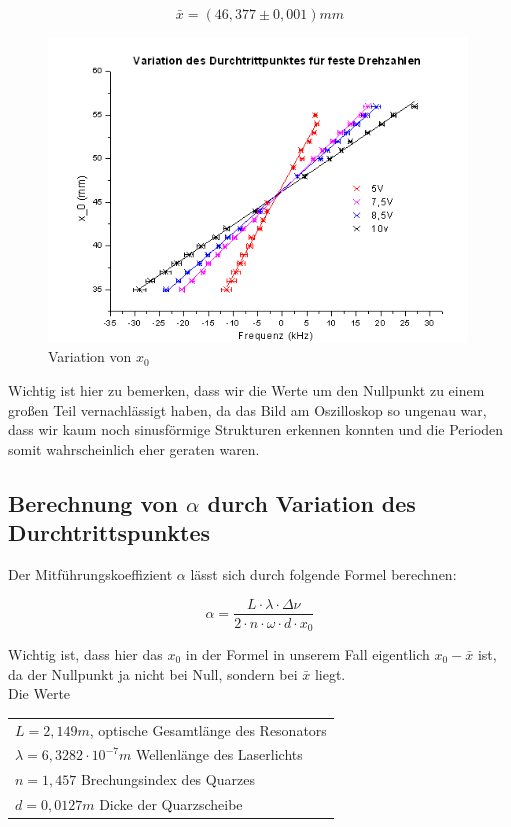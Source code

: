 $$\boxed{\bar x = (46,377 \pm 0,001) mm}$$

\begin{figure}[H]
	\centering \includegraphics[width = 0.99\textwidth]{Bilder/graph1.jpg}
	\caption{Variation von $x_0$}
\end{figure}

Wichtig ist hier zu bemerken, dass wir die Werte um den Nullpunkt zu einem großen Teil vernachlässigt haben, da das Bild am Oszilloskop so ungenau war, dass wir kaum noch sinusförmige Strukturen erkennen konnten und die Perioden somit wahrscheinlich eher geraten waren.

\subsection{Berechnung von $\alpha$ durch Variation des Durchtrittspunktes}

Der Mitführungskoeffizient $\alpha$ lässt sich durch folgende Formel berechnen:

$$\alpha = \frac{L\cdot\lambda\cdot\Delta\nu}{2\cdot n\cdot\omega\cdot d \cdot x_0}$$

Wichtig ist, dass hier das $x_0$ in der Formel in unserem Fall eigentlich $x_0 - \bar x$ ist, da der Nullpunkt ja nicht bei Null, sondern bei $\bar x$ liegt.\\

Die Werte\\

\begin{tabular}[H]{l}
$L = 2,149 m$, optische Gesamtlänge des Resonators\\
$\lambda = 6,3282\cdot10^{-7} m$ Wellenlänge des Laserlichts\\
$n = 1,457$ Brechungsindex des Quarzes\\
$d = 0,0127 m$ Dicke der Quarzscheibe
\end{tabular}\\



